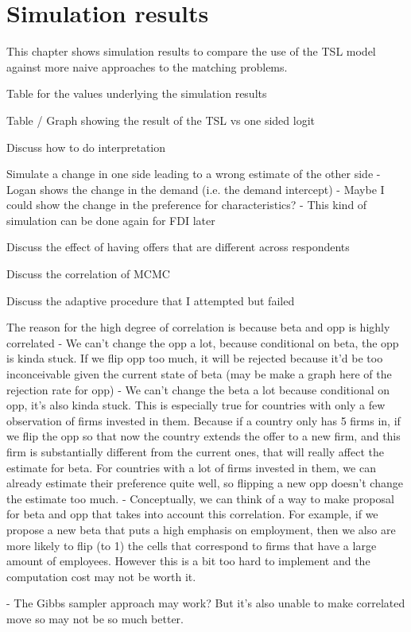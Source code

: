 \chapter{Simulation results}
\label{chap:simulation}

This chapter shows simulation results to compare the use of the TSL model
against more naive approaches to the matching problems.

Table for the values underlying the simulation results

Table / Graph showing the result of the TSL vs one sided logit

Discuss how to do interpretation

Simulate a change in one side leading to a wrong estimate of the other side
- Logan shows the change in the demand (i.e. the demand intercept)
- Maybe I could show the change in the preference for characteristics?
- This kind of simulation can be done again for FDI later

Discuss the effect of having offers that are different across respondents

Discuss the correlation of MCMC

Discuss the adaptive procedure that I attempted but failed

The reason for the high degree of correlation is because beta and opp is highly
correlated
- We can't change the opp a lot, because conditional on beta, the opp is kinda
stuck. If we flip opp too much, it will be rejected because it'd be too
inconceivable given the current state of beta (may be make a graph here of the
rejection rate for opp)
- We can't change the beta a lot because conditional on opp, it's also kinda
stuck. This is especially true for countries with only a few observation of
firms invested in them.
Because if a country only has 5 firms in, if we flip the opp so that now the
country extends the offer to a new firm, and this firm is substantially
different from the current ones, that will really affect the estimate for beta.
For countries with a lot of firms invested in them, we can already estimate
their preference quite well, so flipping a new opp doesn't change the estimate
too much.
- Conceptually, we can think of a way to make proposal for beta and opp that
takes into account this correlation. For example, if we propose a new beta that
puts a high emphasis on employment, then we also are more likely to flip (to 1)
the cells that correspond to firms that have a large amount of employees.
However this is a bit too hard to implement and the computation cost may not be
worth it.

- The Gibbs sampler approach may work? But it's also unable to make correlated
move so may not be so much better.